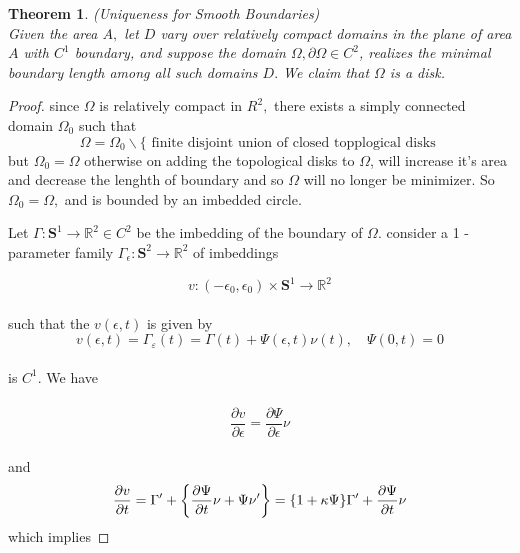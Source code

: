 \documentclass[oneside]{book}
\newtheorem{theorem}{Theorem}[section]
\begin{document}
\begin{theorem}
{(Uniqueness for Smooth Boundaries)}
\label{t:1} \\
 Given
the area $A,$ let $D$ vary over relatively compact domains in the plane of area $A$
with $C^{1}$ boundary, and suppose the domain $\Omega, \partial \Omega \in C^{2}$, realizes the minimal
boundary length among all such domains $D .$ We claim that $\Omega$ is a disk.
\end{theorem}


\begin{proof}

 since $\Omega$ is relatively compact in $R^{2},$ there exists a simply connected
domain $\Omega_{0}$ such that
$$
\Omega=\Omega_{0} \backslash\{\text{ finite disjoint union of closed topplogical disks 
} $$
 but $\Omega_{0}=\Omega $ otherwise on adding the
topological disks to $\Omega$, will increase it's area  and decrease the lenghth of boundary and so $\Omega$ will no longer be minimizer. So $\Omega_{0}=\Omega,$ and is bounded by an imbedded circle.\par
Let $\Gamma: \mathbf{S}^{1} \rightarrow \mathbb{R}^{2} \in C^{2}$ be the imbedding of the boundary of $\Omega .$ 
consider a 1 -parameter family $\Gamma_{\epsilon}: \mathbf{S}^{2} \rightarrow \mathbb{R}^{2}$ of imbeddings
\par
$$
v:\left(-\epsilon_{0}, \epsilon_{0}\right) \times \mathbf{S}^{1} \rightarrow \mathbb{R}^{2}
$$ \\
such that the  $v(\epsilon, t)$ is given by \\
    \begin{equation}
    \label{eq10}  
v(\epsilon, t)=\Gamma_{\varepsilon}(t)=\Gamma(t)+\Psi(\epsilon, t) \nu(t), \quad \Psi(0, t)=0
    \end{equation} \\
is $C^{1} .$ We have \\\\
  \begin{equation}
  \label{eq11}  
\frac{\partial v}{\partial \epsilon}=\frac{\partial \Psi}{\partial \epsilon} \nu
    \end{equation}
 \\ 
 and 
     \begin{equation}
     \label{eq12}  
    \\  \frac{\partial v}{\partial t}=\Gamma^{\prime}+\left\{\frac{\partial \Psi}{\partial t} \nu+\Psi \nu^{\prime}\right\}=\{1+\kappa \Psi\} \Gamma^{\prime}+\frac{\partial \Psi}{\partial t} \nu
                   \end{equation}    
which implies  


\end{proof}
\end{document}
